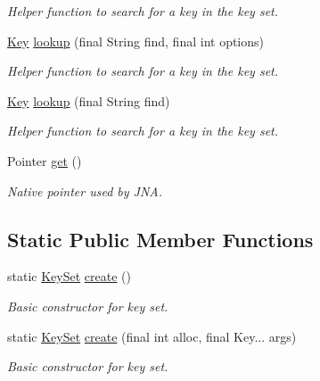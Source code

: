 \begin{DoxyCompactItemize}
\begin{DoxyCompactList}\small\item\em Helper function to search for a key in the key set. \end{DoxyCompactList}\item 
\hyperlink{classorg_1_1libelektra_1_1Key}{Key} \hyperlink{classorg_1_1libelektra_1_1KeySet_aa17a04907eb8c8d2a9a488788d0039ea}{lookup} (final String find, final int options)
\begin{DoxyCompactList}\small\item\em Helper function to search for a key in the key set. \end{DoxyCompactList}\item 
\hyperlink{classorg_1_1libelektra_1_1Key}{Key} \hyperlink{classorg_1_1libelektra_1_1KeySet_a69921726091c9a775bb8ece1f1e3a858}{lookup} (final String find)
\begin{DoxyCompactList}\small\item\em Helper function to search for a key in the key set. \end{DoxyCompactList}\item 
Pointer \hyperlink{classorg_1_1libelektra_1_1KeySet_abf3f028c9c3b88a47aa9d67a5c8e95da}{get} ()
\begin{DoxyCompactList}\small\item\em Native pointer used by J\+NA. \end{DoxyCompactList}\end{DoxyCompactItemize}
\subsection*{Static Public Member Functions}
\begin{DoxyCompactItemize}
\item 
static \hyperlink{classorg_1_1libelektra_1_1KeySet}{Key\+Set} \hyperlink{classorg_1_1libelektra_1_1KeySet_ac0ba4b88bef5e731b586f4ca63b9ab7f}{create} ()
\begin{DoxyCompactList}\small\item\em Basic constructor for key set. \end{DoxyCompactList}\item 
static \hyperlink{classorg_1_1libelektra_1_1KeySet}{Key\+Set} \hyperlink{classorg_1_1libelektra_1_1KeySet_a441d0e45a150a6fd5f75be00ec42338d}{create} (final int alloc, final Key... args)
\begin{DoxyCompactList}\small\item\em Basic constructor for key set. \end{DoxyCompactList}\end{DoxyCompactItemize}
